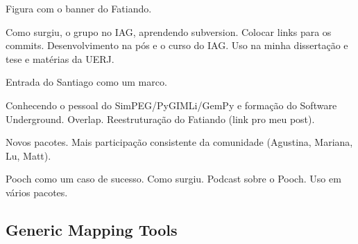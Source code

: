 \documentclass[10pt,a4paper,oneside]{book}
\begin{document}
Figura com o banner do Fatiando.

Como surgiu, o grupo no IAG, aprendendo subversion.
Colocar links para os commits.
Desenvolvimento na pós e o curso do IAG.
Uso na minha dissertação e tese e matérias da UERJ.

Entrada do Santiago como um marco.

Conhecendo o pessoal do SimPEG/PyGIMLi/GemPy e formação do Software Underground.
Overlap.
Reestruturação do Fatiando (link pro meu post).

Novos pacotes.
Mais participação consistente da comunidade (Agustina, Mariana, Lu, Matt).

Pooch como um caso de sucesso.
Como surgiu.
Podcast sobre o Pooch.
Uso em vários pacotes.

\subsection{Generic Mapping Tools}
\end{document}

